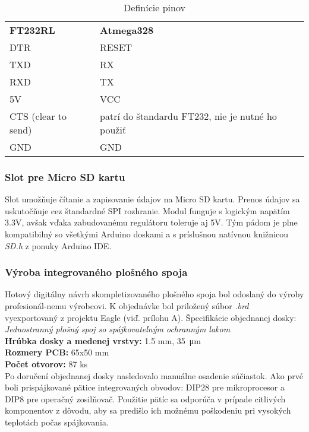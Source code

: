 \documentclass[titlepage,12pt]{article}
\begin{document}
\begin{table}[htb]
\begin{tabular}{ll}
\textbf{FT232RL}  	& \textbf{Atmega328}   \\
DTR          		& RESET                \\
TXD			 		& RX                   \\
RXD					& TX				   \\
5V					& VCC				   \\
CTS (clear to send) & patrí do štandardu FT232, nie je nutné ho použiť \\
GND					& GND
\end{tabular}
\caption{Definície pinov}
\end{table}

\subsubsection*{Slot pre Micro SD kartu}
Slot umožňuje čítanie a zapisovanie údajov na Micro SD kartu. Prenos údajov sa uskutočňuje cez štandardné SPI rozhranie. Modul funguje s logickým napätím 3.3V, avšak vďaka zabudovanému regulátoru toleruje aj 5V. Tým pádom je plne kompatibilný so všetkými Arduino doskami a s príslušnou natívnou knižnicou \emph{SD.h} z ponuky Arduino IDE.

\subsubsection*{Výroba integrovaného plošného spoja}
Hotový digitálny návrh skompletizovaného plošného spoja bol odoslaný do výroby profesionál-nemu výrobcovi. K objednávke bol priložený súbor \textit{.brd} vyexportovaný z projektu Eagle (viď. prílohu A). Špecifikácie objednanej dosky: \\
\emph{Jednostranný plošný spoj so spájkovateľným ochranným lakom} \\
\textbf{Hrúbka dosky a medenej vrstvy:} 1.5 mm, \SI{35}{\micro\m} \\
\textbf{Rozmery PCB:} 65x50 mm \\
\textbf{Počet otvorov:} 87 ks \\

Po doručení objednanej dosky nasledovalo manuálne osadenie súčiastok. Ako prvé boli prispájkované pätice integrovaných obvodov: DIP28 pre mikroprocesor a DIP8 pre operačný zosilňovač. Použitie pätíc sa odporúča v prípade citlivých komponentov z dôvodu, aby sa predišlo ich možnému poškodeniu pri vysokých teplotách počas spájkovania.
\end{document}
